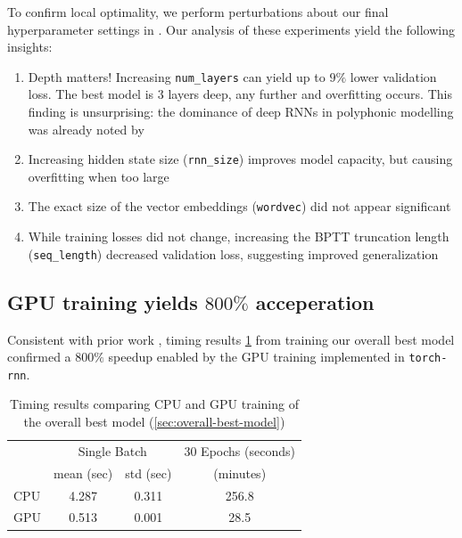 To confirm local optimality, we perform perturbations about our final
hyperparameter settings in
.
Our analysis of these experiments yield the following insights:
\begin{enumerate}
  \item Depth matters! Increasing \texttt{num\_layers} can yield up to $9\%$ lower validation loss.
    The best model is $3$ layers deep, any further and overfitting occurs.
    This finding is unsurprising: the dominance of deep RNNs in polyphonic
    modelling was already noted by \citet{pascanu2013construct}
  \item Increasing hidden state size (\texttt{rnn\_size}) improves model capacity, but causing overfitting when too large
  \item The exact size of the vector embeddings (\texttt{wordvec}) did not appear significant
  \item While training losses did not change, increasing the BPTT truncation length (\texttt{seq\_length})
    decreased validation loss, suggesting improved generalization
\end{enumerate}

\subsection{GPU training yields $800\%$ acceperation}

Consistent with prior work \citep{sutskever2014sequence,kaiser2015neural},
timing results \cref{tab:gpu-training} from training our overall best model
confirmed a $800\%$ speedup enabled by the GPU training implemented in
\texttt{torch-rnn}.

\begin{table}[tb]
  \centering
  \caption{Timing results comparing CPU and GPU training of the overall best model (\vref{sec:overall-best-model})}
  \label{tab:gpu-training}
  \begin{tabular}{l c c c}
    \toprule
    \multirow{2}{*}{} & \multicolumn{2}{c}{Single Batch} & 30 Epochs (seconds) \\
    \cmidrule{2-4}
    & mean (sec) & std (sec) & (minutes)\\
    \midrule
    CPU & 4.287 & 0.311 & 256.8\\
    GPU & 0.513 & 0.001 &  28.5\\
    \bottomrule
  \end{tabular}
\end{table}

